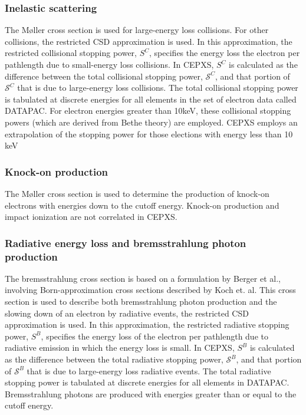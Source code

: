 \subsubsection{Inelastic scattering}
The M\o ller cross section is used for large-energy loss collisions. For other
collisions, the restricted CSD approximation is used. In this approximation,
the restricted collisional stopping power, $S^C$, specifies the energy loss
the electron per pathlength due to small-energy loss collisions. In CEPXS,
$S^C$ is calculated as the difference between the total collisional stopping
power, $\mathcal{S}^C$, and that portion of $\mathcal{S}^C$ that is due to
large-energy loss collisions. The total collisional stopping power is
tabulated at discrete energies for all elements in the set of electron data
called DATAPAC. For electron energies greater than 10keV, these collisional
stopping powers (which are derived from Bethe theory) are employed. CEPXS
employs an extrapolation of the stopping power for those elections with energy
less than 10 keV

\subsubsection{Knock-on production}
The M\o ller cross section is used to determine the production of knock-on
electrons with energies down to the cutoff energy. Knock-on production and
impact ionization are not correlated in CEPXS.

\subsubsection{Radiative energy loss and bremsstrahlung photon production}
The bremsstrahlung cross section is based on a formulation by Berger et al.,
involving Born-approximation cross sections described by Koch et. al. This
cross section is used to describe both bremsstrahlung photon production and
the slowing down of an electron by radiative events, the restricted CSD
approximation is used. In this approximation, the restricted radiative
stopping power, $S^B$, specifies the energy loss of the electron per
pathlength due to radiative emission in which the energy loss is small. In
CEPXS, $S^B$ is calculated as the difference between the total radiative
stopping power, $\mathcal{S}^B$, and that portion of $\mathcal{S}^B$ that is
due to large-energy loss radiative events. The total radiative stopping power
is tabulated at discrete energies for all elements in DATAPAC.\\
Bremsstrahlung photons are produced with energies greater than or equal to the
cutoff energy. 

